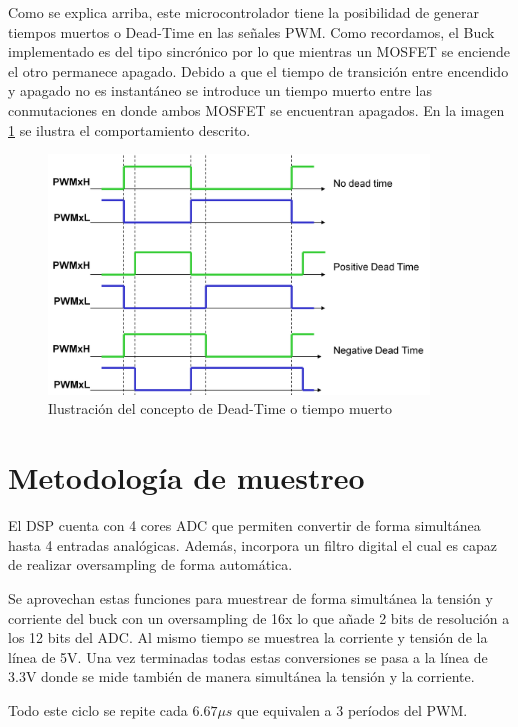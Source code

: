 \documentclass[12pt]{report}
\begin{document}
Como se explica arriba, este microcontrolador tiene la posibilidad de generar tiempos muertos o Dead-Time en las señales PWM. Como recordamos, el Buck implementado es del tipo sincrónico por lo que mientras un MOSFET se enciende el otro permanece apagado. Debido a que el tiempo de transición entre encendido y apagado no es instantáneo se introduce un tiempo muerto entre las conmutaciones en donde ambos MOSFET se encuentran apagados. En la imagen \ref{deadtime} se ilustra el comportamiento descrito.

\begin{figure}[H]
	\centering
	\includegraphics[width=0.9\textwidth,height=\textheight,keepaspectratio]{deadtime}
	\caption{Ilustración del concepto de Dead-Time o tiempo muerto}
	\label{deadtime}
\end{figure}

\section{Metodología de muestreo}

El DSP cuenta con 4 cores ADC que permiten convertir de forma simultánea hasta 4 entradas analógicas. Además, incorpora un filtro digital el cual es capaz de realizar oversampling de forma automática. 

Se aprovechan estas funciones para muestrear de forma simultánea la tensión y corriente del buck con un oversampling de 16x lo que añade 2 bits de resolución a los 12 bits del ADC. Al mismo tiempo se muestrea la corriente y tensión de la línea de 5V. Una vez terminadas todas estas conversiones se pasa a la línea de 3.3V donde se mide también de manera simultánea la tensión y la corriente.

Todo este ciclo se repite cada $6.67 \mu s$ que equivalen a 3 períodos del PWM.
\end{document}

